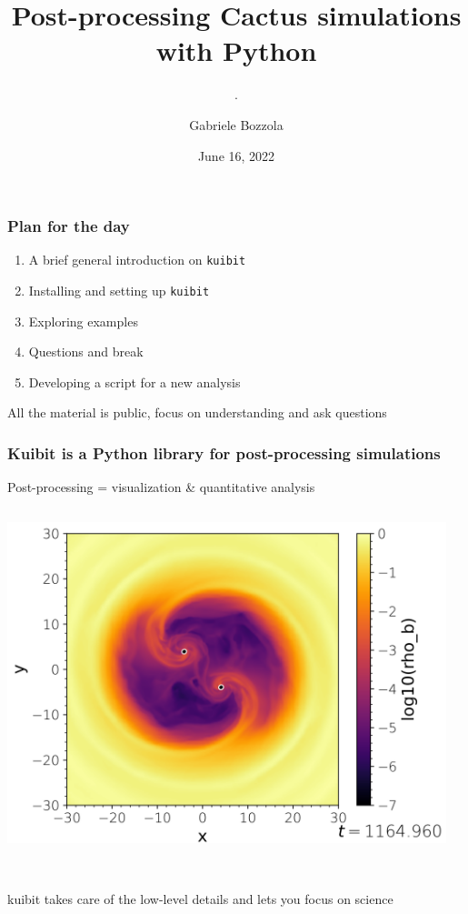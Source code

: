 \documentclass[compress, aspectratio=169]{beamer}
\title{\Large \Medium Post-processing Cactus simulations with Python}
\subtitle{\tiny .}
\date{June 16, 2022 \vspace*{-0.25cm}}
\author{{Gabriele Bozzola}}
\institute{Department of Astronomy and Steward Observatory, \\
  University of Arizona}
\begin{document}
{
  \begin{frame}
    \titlepage
  \end{frame}
}

\begin{frame}
  \frametitle{Plan for the day}
  \centering
    \begin{enumerate}
      \item A brief general introduction on \texttt{kuibit}
      \item Installing and setting up \texttt{kuibit}
      \item Exploring examples
      \item Questions and break
      \item Developing a script for a new analysis
    \end{enumerate}
    All the material is public, focus on understanding and ask questions
\end{frame}

\begin{frame}
  \frametitle{Kuibit is a Python library for post-processing simulations}
  \centering

  Post-processing = visualization \& quantitative analysis \\[1cm]

     \begin{columns}
       \begin{column}{0.5\linewidth}
         \centering
         \includegraphics[width=0.8\columnwidth]{grid2D}
       \end{column}
       \begin{column}{0.5\linewidth}
         \hspace{-1cm}
         
       \end{column}
     \end{columns}
     \hfill\\[1cm]

    {\Medium kuibit takes care of the low-level details and lets you focus
       on science}
\end{frame}
\end{document}
